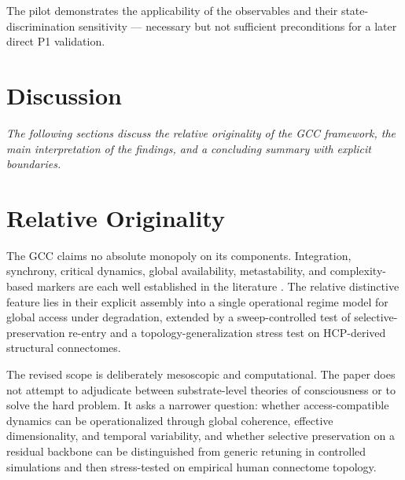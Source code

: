 \documentclass[11pt,a4paper]{article}
\theoremstyle{plain}
\theoremstyle{definition}
\theoremstyle{remark}
\begin{document}
The pilot demonstrates the applicability of the observables and their state-discrimination sensitivity --- necessary but not sufficient preconditions for a later direct P1 validation.


\section*{Discussion}

\noindent\textit{The following sections discuss the relative originality of the GCC framework, the main interpretation of the findings, and a concluding summary with explicit boundaries.}

\section{Relative Originality}
\label{sec:originalitaet}

The GCC claims no absolute monopoly on its components. Integration, synchrony, critical dynamics, global availability, metastability, and complexity-based markers are each well established in the literature \citep{dehaene1998,tononi2004,fries2015,kelso2012,deco2017,casali2013,demertzi2019,carhartharris2014,schartner2015,luppi2019}. The relative distinctive feature lies in their explicit assembly into a single operational regime model for global access under degradation, extended by a sweep-controlled test of selective-preservation re-entry and a topology-generalization stress test on HCP-derived structural connectomes.

The revised scope is deliberately mesoscopic and computational. The paper does not attempt to adjudicate between substrate-level theories of consciousness or to solve the hard problem. It asks a narrower question: whether access-compatible dynamics can be operationalized through global coherence, effective dimensionality, and temporal variability, and whether selective preservation on a residual backbone can be distinguished from generic retuning in controlled simulations and then stress-tested on empirical human connectome topology.


\end{document}
